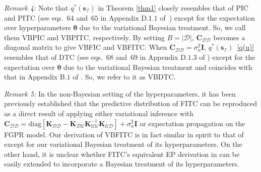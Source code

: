 \documentclass[conference]{IEEEtran}
\begin{document}
\emph{Remark 4:} Note that $q^*(\mathbf{s}_\mathcal{I})$ in Theorem \ref{thm1} closely resembles that of PIC and PITC (see eqs.~$64$ and~$65$ in Appendix D.$1$.$1$ of~\cite{NghiaICML15}) except for the expectation over hyperparameters $\boldsymbol{\theta}$ due to the variational Bayesian treatment. So, we call them VBPIC and VBPITC, respectively. By setting $B = |\mathcal{D}|$, $\mathbf{C}_{\mathcal{DD}}$ becomes a diagonal matrix to give VBFIC and VBFITC. When $\mathbf{C}_{\mathcal{DD}}=\sigma^2_n\mathbf{I}$, $q^*(\mathbf{s}_\mathcal{I})$~\eqref{q(u)} resembles that of DTC (see eqs.~$68$ and~$69$ in Appendix D.$1$.$3$ of \cite{NghiaICML15}) except for the expectation over $\boldsymbol{\theta}$ due to the variational Bayesian treatment and coincides with that in Appendix B.$1$ of \cite{Titsias13}. So, we refer to it as VBDTC.\vspace{1mm} 

\emph{Remark 5:} In the non-Bayesian setting of the hyperparameters, it has been previously established that the predictive distribution of FITC can be reproduced as a direct result of applying either variational inference \cite{Titsias09a} with $\mathbf{C}_{\mathcal{DD}}=\mathrm{diag}[\mathbf{K}_{\mathcal{D}\mathcal{D}}-\mathbf{K}_{\mathcal{D}\mathcal{U}}\mathbf{K}^{-1}_{\mathcal{U}\mathcal{U}}\mathbf{K}_{\mathcal{U}\mathcal{D}}]+\sigma^2_n\mathbf{I}$ or expectation propagation \cite{Matthias2016Understanding} on the FGPR model. Our derivation of VBFITC is in fact similar in spirit to that of \cite{Titsias09a} except for our variational Bayesian treatment of its hyperparameters. On the other hand, it is unclear whether FITC's equivalent EP derivation in \cite{Matthias2016Understanding} can be easily extended to incorporate a Bayesian treatment of its hyperparameters.%
%
%	
\end{document}
